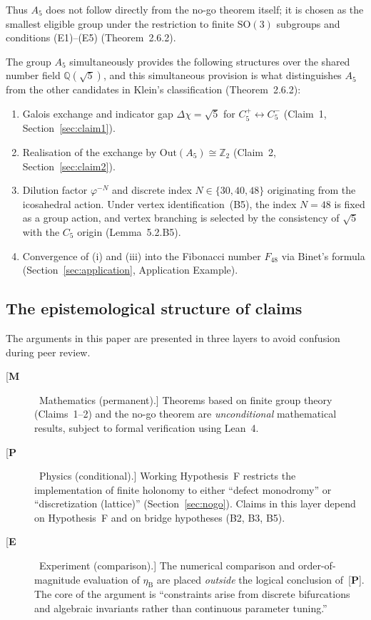 \documentclass[sn-mathphys-num,Numbered]{sn-jnl}
\theoremstyle{thmstyleone}
\theoremstyle{thmstylethree}
\theoremstyle{thmstyletwo}
\newcommand{\Out}{\mathrm{Out}}
\newcommand{\SO}{\mathrm{SO}}
\newcommand{\etaB}{\eta_{\mathrm{B}}}
\newcommand{\Qsqrt}{\mathbb{Q}(\sqrt{5})}
\newcommand{\tagM}{[\textbf{M}]}
\newcommand{\tagP}{[\textbf{P}]}
\newcommand{\tagE}{[\textbf{E}]}
\begin{document}
Thus $A_5$ does not follow directly from the no-go theorem itself; it
is chosen as the smallest eligible group under the restriction to finite
$\SO(3)$ subgroups and conditions (E1)--(E5) (Theorem~2.6.2).

The group $A_5$ simultaneously provides the following structures over
the shared number field $\Qsqrt$, and this simultaneous provision is
what distinguishes $A_5$ from the other candidates in Klein's
classification (Theorem~2.6.2):
\begin{enumerate}
  \item[(i)] Galois exchange and indicator gap
    $\Delta\chi = \sqrt{5}$ for $C_5^+ \leftrightarrow C_5^-$
    (Claim~1, Section~\ref{sec:claim1}).
  \item[(ii)] Realisation of the exchange by
    $\Out(A_5) \cong \mathbb{Z}_2$ (Claim~2, Section~\ref{sec:claim2}).
  \item[(iii)] Dilution factor $\varphi^{-N}$ and discrete index
    $N \in \{30, 40, 48\}$ originating from the icosahedral action.
    Under vertex identification~(B5), the index $N=48$ is fixed as a
    group action, and vertex branching is selected by the consistency of
    $\sqrt{5}$ with the $C_5$ origin (Lemma~5.2.B5).
  \item[(iv)] Convergence of (i) and (iii) into the Fibonacci number
    $F_{48}$ via Binet's formula (Section~\ref{sec:application}, Application Example).
\end{enumerate}

\subsection{The epistemological structure of claims}
\label{ssec:epistemic}

The arguments in this paper are presented in three layers to avoid
confusion during peer review.

\begin{description}
  \item[\tagM\ Mathematics (permanent).]
    Theorems based on finite group theory (Claims~1--2) and the no-go
    theorem are \emph{unconditional} mathematical results, subject to
    formal verification using Lean~4.

  \item[\tagP\ Physics (conditional).]
    Working Hypothesis~F restricts the implementation of finite holonomy
    to either ``defect monodromy'' or ``discretization (lattice)''
    (Section~\ref{sec:nogo}). Claims in this layer depend on Hypothesis~F and on
    bridge hypotheses (B2, B3, B5).

  \item[\tagE\ Experiment (comparison).]
    The numerical comparison and order-of-magnitude evaluation of $\etaB$
    are placed \emph{outside} the logical conclusion of~\tagP. The core
    of the argument is ``constraints arise from discrete bifurcations and
    algebraic invariants rather than continuous parameter tuning.''
\end{description}
\end{document}

